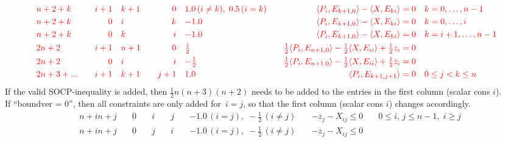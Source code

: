 \documentclass[11pt,a4paper]{article}
\theoremstyle{definition}
\begin{document}
{\[\begin{aligned}
    &{\color{red}n+2+k} \quad &{\color{red}i+1} \quad & {\color{red}k+1} \quad
    & {\color{red}0} \quad & {\color{red}1.0\, (i\neq k),\; 0.5\, (i=k)} \quad & {\color{red} \langle
      P_i, E_{k+1,0} \rangle - \langle X,E_{ki}\rangle = 0} \quad &
    {\color{red} k = 0,\dots,n-1} \\
    &{\color{red}n+2+k} \quad &{\color{red}0} \quad & {\color{red}i} \quad
    & {\color{red}k} \quad & {\color{red}-1.0} \quad & {\color{red} \langle
      P_i, E_{k+1,0} \rangle - \langle X,E_{ki}\rangle = 0} \quad &
    {\color{red} k = 0,\dots,i} \\
    &{\color{red}n+2+k} \quad &{\color{red}0} \quad & {\color{red}k} \quad
    & {\color{red}i} \quad & {\color{red}-1.0} \quad & {\color{red} \langle
      P_i, E_{k+1,0} \rangle - \langle X,E_{ki}\rangle = 0} \quad &
    {\color{red} k = i+1,\dots,n-1} \\    
    &{\color{red}2n+2} \quad &{\color{red}i+1} \quad & {\color{red}n+1} \quad
    & {\color{red}0} \quad & {\color{red}\tfrac{1}{2}} \quad & {\color{red}
      \tfrac{1}{2}\langle P_i, E_{n+1,0} \rangle - \tfrac{1}{2} \langle
      X,E_{ii}\rangle + \tfrac{1}{2}z_i = 0} \quad & \\
    &{\color{red}2n+2} \quad &{\color{red}0} \quad & {\color{red}i} \quad
    & {\color{red}i} \quad & {\color{red}-\tfrac{1}{2}} \quad & {\color{red}
      \tfrac{1}{2}\langle P_i, E_{n+1,0} \rangle - \tfrac{1}{2} \langle
      X,E_{ii}\rangle + \tfrac{1}{2}z_i = 0} \quad & \\
    &{\color{red}2n+3+...} \quad &{\color{red}i+1} \quad & {\color{red}k+1} \quad
    & {\color{red}j+1} \quad & {\color{red}1.0} \quad & {\color{red}
     \langle P_i, E_{k+1,j+1} \rangle = 0} \quad & {\color{red} 0 \leq j < k \leq n}
  \end{aligned}
\]
\noindent
{\color{red} If the valid SOCP-inequality is added, then $\tfrac{1}{2}n(n+3)(n+2)$ needs
  to be added to the entries in the first column (scalar cons $i$).}\\
{\color{violet} If ``boundver = 0'', then all constraints are only added
  for~$i=j$, so that the first column (scalar cons $i$) changes accordingly.}\\
\[
  \begin{aligned}
    &n+in+j \quad & 0 \quad & i \quad & j \quad & -1.0\,
    (i = j),\; -\tfrac{1}{2}\, (i\neq j) \quad & -z_j - X_{ij} \leq 0 \quad &
    0 \leq i,\, j \leq n-1,\; i \geq j \\
    &n+in+j \quad & 0 \quad & j \quad & i \quad & -1.0\,
    (i = j),\; -\tfrac{1}{2}\, (i\neq j) \quad & -z_j - X_{ij} \leq 0 \quad &

\end{aligned}\]}
\end{document}
